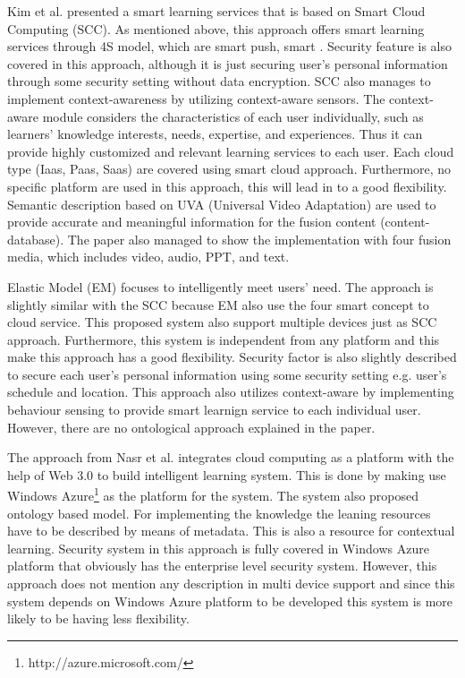 \documentclass[journal]{vgtc}                %
\begin{document}
Kim et al. presented a smart learning services that is based on Smart Cloud Computing (SCC). As mentioned above, this approach offers smart learning services through 4S model, which are smart push, smart . Security feature is also covered in this approach, although it is just securing user's personal information through some security setting without data encryption. SCC also manages to implement context-awareness by utilizing context-aware sensors. The context-aware module considers the characteristics of each user individually, such as learners’ knowledge interests, needs, expertise, and experiences. Thus it can provide highly customized and relevant learning services to each user. Each cloud type (Iaas, Paas, Saas) are covered using smart cloud approach. Furthermore, no specific platform are used in this approach, this will lead in to a good flexibility. Semantic description based on UVA (Universal Video Adaptation) are used to provide accurate and meaningful information for the fusion content (content-database). The paper also managed to show the implementation with four fusion media, which includes video, audio, PPT, and text.

Elastic Model (EM) \cite{Kim2013} focuses to intelligently meet users' need. The approach is slightly similar with the SCC because EM also use the four smart concept to cloud service. This proposed system also support multiple devices just as SCC approach. Furthermore, this system is independent from any platform and this make this approach has a good flexibility. Security factor is also slightly described to secure each user's personal information using some security setting e.g. user's schedule and location. This approach also utilizes context-aware by implementing behaviour sensing to provide smart learnign service to each individual user. However, there are no ontological approach explained in the paper. 

The approach from Nasr et al. \cite{nasr2012proposed} integrates cloud computing as a platform with the help of Web 3.0 to build intelligent learning system. This is done by making use Windows Azure\footnote{http://azure.microsoft.com/} as the platform for the system. The system also proposed ontology based model. For implementing the knowledge the leaning resources have to be described by means of metadata. This is also a resource for contextual learning. Security system in this approach is fully covered in Windows Azure platform that obviously has the enterprise level security system. However, this approach does not mention any description in multi device support and since this system depends on Windows Azure platform to be developed this system is more likely to be having less flexibility.
\end{document}
